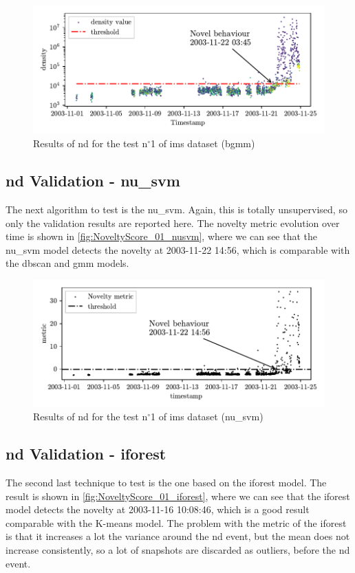 \begin{figure}
    \centering
    \includegraphics{images/IMS/Novelty_01_500samples_bearing3x_GMM_bayesan.pdf}
    \caption{Results of \gls{nd} for the test $\text{n}^\circ$1 of \gls{ims} dataset (\gls{bgmm})}
    \label{fig:NoveltyScore_01_bgmm}
\end{figure}

\subsection{\gls{nd} Validation - \gls{nu_svm}}
The next algorithm to test is the \gls{nu_svm}. Again, this is totally unsupervised, so only the validation results are reported here. The novelty metric evolution over time is shown in \autoref{fig:NoveltyScore_01_nusvm}, where we can see that the \gls{nu_svm} model detects the novelty at 2003-11-22 14:56, which is comparable with the \gls{dbscan} and \gls{gmm} models.

\begin{figure}
    \centering
    \includegraphics{images/IMS/Novelty_01_500samples_bearing3x_nusvm.pdf}
    \caption{Results of \gls{nd} for the test $\text{n}^\circ$1 of \gls{ims} dataset (\gls{nu_svm})}
    \label{fig:NoveltyScore_01_nusvm}
\end{figure}

\subsection{\gls{nd} Validation - \gls{iforest}}
The second last technique to test is the one based on the \gls{iforest} model. The result is shown in \autoref{fig:NoveltyScore_01_iforest}, where we can see that the \gls{iforest} model detects the novelty at 2003-11-16 10:08:46, which is a good result comparable with the K-means model. The problem with the metric of the \gls{iforest} is that it increases a lot the variance around the \gls{nd} event, but the mean does not increase consistently, so a lot of snapshots are discarded as outliers, before the \gls{nd} event. 

